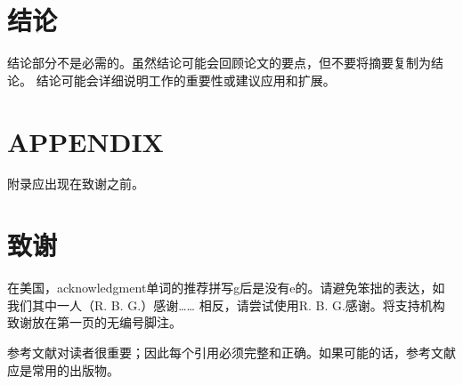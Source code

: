 \documentclass[letterpaper, 10 pt, conference]{ieeeconf}  %
\begin{document}
\section{结论}

结论部分不是必需的。虽然结论可能会回顾论文的要点，但不要将摘要复制为结论。 结论可能会详细说明工作的重要性或建议应用和扩展。

\addtolength{\textheight}{-12cm}   







\section*{APPENDIX}

附录应出现在致谢之前。

\section*{致谢}

在美国，acknowledgment单词的推荐拼写g后是没有e的。请避免笨拙的表达，如我们其中一人（R. B. G.）感谢…… 相反，请尝试使用R. B. G.感谢。将支持机构致谢放在第一页的无编号脚注。




参考文献对读者很重要；因此每个引用必须完整和正确。如果可能的话，参考文献应是常用的出版物。
\end{document}

